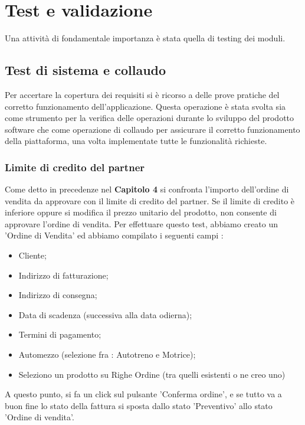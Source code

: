 
\hypertarget{(chap:capitolo5)}{}
\chapter{Test e validazione}
Una attività di fondamentale importanza è stata quella di testing dei moduli.


\section{Test di sistema e collaudo}

Per accertare la copertura dei requisiti si è ricorso a delle prove pratiche del corretto funzionamento dell’applicazione. Questa operazione è stata svolta sia come strumento per la verifica delle operazioni durante lo sviluppo del prodotto software che come operazione di collaudo per assicurare il corretto funzionamento della piattaforma, una volta implementate tutte le funzionalità richieste.

\subsection{Limite di credito del partner}

Come detto in precedenze nel \hypertarget{(chap:capitolo4)}{\textbf{Capitolo 4}} si confronta l'importo dell'ordine di vendita da approvare con il limite di credito del partner. Se il limite di credito è inferiore oppure si modifica il prezzo unitario del prodotto, non consente di approvare l'ordine di vendita.
\newpage
Per effettuare questo test, abbiamo creato un 'Ordine di Vendita' ed abbiamo compilato i seguenti campi :
\begin{itemize}
\item Cliente;
\item Indirizzo di fatturazione;
\item Indirizzo di consegna;
\item Data di scadenza (successiva alla data odierna);
\item Termini di pagamento;
\item Automezzo (selezione fra : Autotreno e Motrice);
\item Seleziono un prodotto su Righe Ordine (tra quelli esistenti o ne creo uno)
\end{itemize}

A questo punto, si fa un click sul pulsante 'Conferma ordine', e se tutto va a buon fine lo stato della fattura si sposta dallo stato 'Preventivo' allo stato 'Ordine di vendita'.


